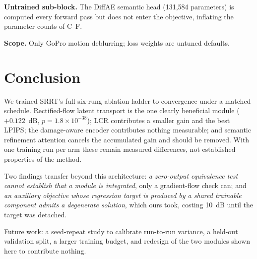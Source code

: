 \documentclass[conference]{IEEEtran}
\newcommand{\bs}[1]{\textbf{#1}}
\begin{document}
\bs{Untrained sub-block.} The DiffAE semantic head (131{,}584 parameters) is
computed every forward pass but does not enter the objective, inflating the
parameter counts of C--F.

\bs{Scope.} Only GoPro motion deblurring; loss weights are untuned defaults.

\section{Conclusion}

We trained SRRT's full six-rung ablation ladder to convergence under a matched
schedule. Rectified-flow latent transport is the one clearly beneficial module
($+0.122$~dB, $p=1.8\times10^{-38}$); LCR contributes a smaller gain and the
best LPIPS; the damage-aware encoder contributes nothing measurable; and
semantic refinement attention cancels the accumulated gain and should be
removed. With one training run per arm these remain measured differences, not
established properties of the method.

Two findings transfer beyond this architecture: \emph{a zero-output equivalence
test cannot establish that a module is integrated}, only a gradient-flow check
can; and \emph{an auxiliary objective whose regression target is produced by a
shared trainable component admits a degenerate solution}, which ours took,
costing 10~dB until the target was detached.

Future work: a seed-repeat study to calibrate run-to-run variance, a held-out
validation split, a larger training budget, and redesign of the two modules
shown here to contribute nothing.
\end{document}
